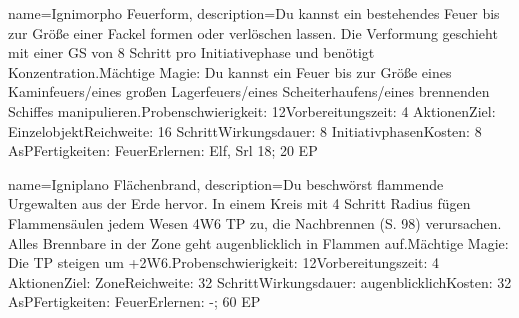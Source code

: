{
    name={Ignimorpho Feuerform},
    description={Du kannst ein bestehendes Feuer bis zur Größe einer Fackel formen oder verlöschen lassen. Die Verformung geschieht mit einer GS von 8 Schritt pro Initiativephase und benötigt Konzentration.\newline Mächtige Magie: Du kannst ein Feuer bis zur Größe eines Kaminfeuers/eines großen Lagerfeuers/eines Scheiterhaufens/eines brennenden Schiffes manipulieren.\newline Probenschwierigkeit: 12\newline Vorbereitungszeit: 4 Aktionen\newline Ziel: Einzelobjekt\newline Reichweite: 16 Schritt\newline Wirkungsdauer: 8 Initiativphasen\newline Kosten: 8 AsP\newline Fertigkeiten: Feuer\newline Erlernen: Elf, Srl 18; 20 EP}
}


{
    name={Igniplano Flächenbrand},
    description={Du beschwörst flammende Urgewalten aus der Erde hervor. In einem Kreis mit 4 Schritt Radius fügen Flammensäulen jedem Wesen 4W6 TP zu, die Nachbrennen (S. 98) verursachen. Alles Brennbare in der Zone geht augenblicklich in Flammen auf.\newline Mächtige Magie: Die TP steigen um +2W6.\newline Probenschwierigkeit: 12\newline Vorbereitungszeit: 4 Aktionen\newline Ziel: Zone\newline Reichweite: 32 Schritt\newline Wirkungsdauer: augenblicklich\newline Kosten: 32 AsP\newline Fertigkeiten: Feuer\newline Erlernen: -; 60 EP}
}


